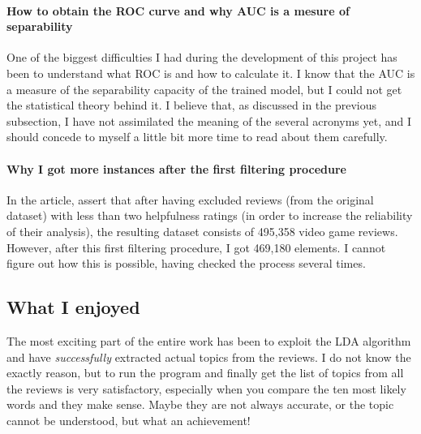 \documentclass[a4paper]{article}
\begin{document}
				\paragraph{How to obtain the ROC curve and why AUC is a mesure of separability} One of the biggest difficulties I had during the development of this project has been to understand what ROC is and how to calculate it. I know that the AUC is a measure of the separability capacity of the trained model, but I could not get the statistical theory behind it. I believe that, as discussed in the previous subsection, I have not assimilated the meaning of the several acronyms yet, and I should concede to myself a little bit more time to read about them carefully.
				
				\paragraph{Why I got more instances after the first filtering procedure} 
				In the article, \citeauthor{article:muller} assert that after having excluded reviews (from the original dataset) with less than
				two helpfulness ratings (in order to increase the reliability
				of their analysis), the resulting dataset consists of 495,358 video
				game reviews. However, after this first filtering procedure, I got 469,180 elements. I cannot figure out how this is possible, having checked the process several times.
				
			\subsection{What I enjoyed}
				The most exciting part of the entire work has been to exploit the LDA algorithm and have \emph{successfully} extracted actual topics from the reviews. I do not know the exactly reason, but to run the program and finally get the list of topics from all the reviews is very satisfactory, especially when you compare the ten most likely words and they make sense. Maybe they are not always accurate, or the topic cannot be understood, but what an achievement!
	\clearpage
	\nocite{*}
	\printbibliography 
		
\end{document}
